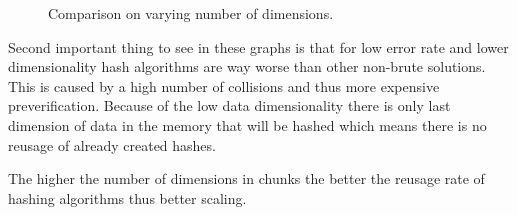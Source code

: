 \begin{figure}
\begin{minipage}{.5\linewidth}
\centering
{}
\end{minipage}%
\begin{minipage}{.5\linewidth}
\centering
{}
\end{minipage}\par\medskip

\caption{Comparison on varying number of dimensions.}
\label{fig_dimRes}
\end{figure}

Second important thing to see in these graphs is that for low error rate and lower dimensionality hash algorithms are way worse than other non-brute solutions. This is caused by a high number of collisions and thus more expensive preverification. Because of the low data dimensionality there is only last dimension of data in the memory that will be hashed which means there is no reusage of already created hashes.

The higher the number of dimensions in chunks the better the reusage rate of hashing algorithms thus better scaling.

